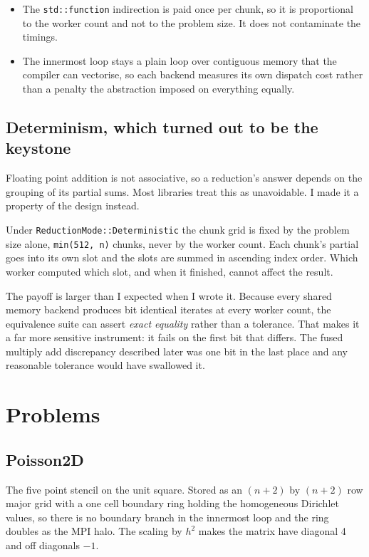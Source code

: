 \documentclass[11pt,a4paper]{report}
\begin{document}
\begin{itemize}[leftmargin=*]
  \item The \texttt{std::function} indirection is paid once per chunk, so it is
        proportional to the worker count and not to the problem size. It does not
        contaminate the timings.
  \item The innermost loop stays a plain loop over contiguous memory that the
        compiler can vectorise, so each backend measures its own dispatch cost
        rather than a penalty the abstraction imposed on everything equally.
\end{itemize}

\subsection{Determinism, which turned out to be the keystone}

Floating point addition is not associative, so a reduction's answer depends on
the grouping of its partial sums. Most libraries treat this as unavoidable. I
made it a property of the design instead.

Under \texttt{ReductionMode::Deterministic} the chunk grid is fixed by the
problem size alone, \texttt{min(512, n)} chunks, never by the worker count. Each
chunk's partial goes into its own slot and the slots are summed in ascending
index order. Which worker computed which slot, and when it finished, cannot
affect the result.

The payoff is larger than I expected when I wrote it. Because every shared memory
backend produces bit identical iterates at every worker count, the equivalence
suite can assert \emph{exact equality} rather than a tolerance. That makes it a
far more sensitive instrument: it fails on the first bit that differs. The fused
multiply add discrepancy described later was one bit in the last place and any
reasonable tolerance would have swallowed it.

\section{Problems}

\subsection{Poisson2D}

The five point stencil on the unit square. Stored as an $(n+2)$ by $(n+2)$ row
major grid with a one cell boundary ring holding the homogeneous Dirichlet
values, so there is no boundary branch in the innermost loop and the ring doubles
as the MPI halo. The scaling by $h^2$ makes the matrix have diagonal 4 and off
diagonals $-1$.
\end{document}
